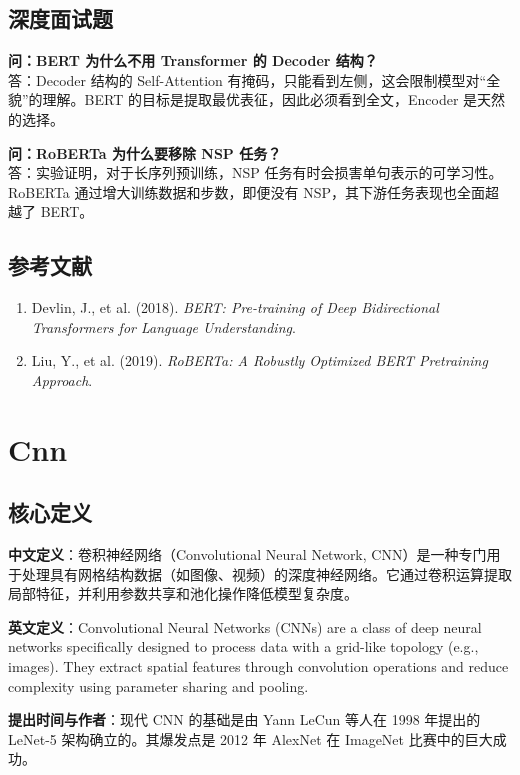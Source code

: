 \documentclass[12pt, a4paper]{book}
\begin{document}
\section{深度面试题}

\textbf{问：BERT 为什么不用 Transformer 的 Decoder 结构？}\\
答：Decoder 结构的 Self-Attention 有掩码，只能看到左侧，这会限制模型对“全貌”的理解。BERT 的目标是提取最优表征，因此必须看到全文，Encoder 是天然的选择。

\textbf{问：RoBERTa 为什么要移除 NSP 任务？}\\
答：实验证明，对于长序列预训练，NSP 任务有时会损害单句表示的可学习性。RoBERTa 通过增大训练数据和步数，即便没有 NSP，其下游任务表现也全面超越了 BERT。

\section{参考文献}
\begin{enumerate}
    \item Devlin, J., et al. (2018). \textit{BERT: Pre-training of Deep Bidirectional Transformers for Language Understanding}.
    \item Liu, Y., et al. (2019). \textit{RoBERTa: A Robustly Optimized BERT Pretraining Approach}.
\end{enumerate}

\chapter{Cnn}


\section{核心定义}
\textbf{中文定义}：卷积神经网络（Convolutional Neural Network, CNN）是一种专门用于处理具有网格结构数据（如图像、视频）的深度神经网络。它通过卷积运算提取局部特征，并利用参数共享和池化操作降低模型复杂度。

\textbf{英文定义}：Convolutional Neural Networks (CNNs) are a class of deep neural networks specifically designed to process data with a grid-like topology (e.g., images). They extract spatial features through convolution operations and reduce complexity using parameter sharing and pooling.

\textbf{提出时间与作者}：现代 CNN 的基础是由 Yann LeCun 等人在 1998 年提出的 LeNet-5 架构确立的。其爆发点是 2012 年 AlexNet 在 ImageNet 比赛中的巨大成功。
\end{document}
